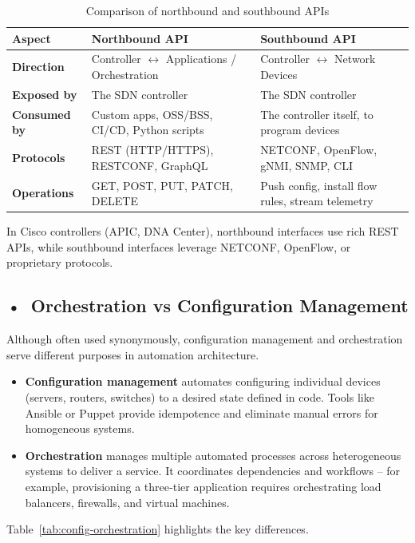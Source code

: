 \begin{table}[!htbp]
\centering
\small
\begin{tabularx}{\textwidth}{|p{2.5cm}|X|X|}
\hline
\textbf{Aspect} & \textbf{Northbound API} & \textbf{Southbound API} \\ \hline
\textbf{Direction} & Controller $\leftrightarrow$ Applications / Orchestration & Controller $\leftrightarrow$ Network Devices \\ \hline
\textbf{Exposed by} & The SDN controller & The SDN controller \\ \hline
\textbf{Consumed by} & Custom apps, OSS/BSS, CI/CD, Python scripts & The controller itself, to program devices \\ \hline
\textbf{Protocols} & REST (HTTP/HTTPS), RESTCONF, GraphQL & NETCONF, OpenFlow, gNMI, SNMP, CLI \\ \hline
\textbf{Operations} & GET, POST, PUT, PATCH, DELETE & Push config, install flow rules, stream telemetry \\ \hline
\end{tabularx}
\caption{Comparison of northbound and southbound APIs}
\label{tab:northbound-southbound}
\end{table}

In Cisco controllers (APIC, DNA Center), northbound interfaces use rich REST APIs, while southbound interfaces leverage NETCONF, OpenFlow, or proprietary protocols.

\subsection*{\mbox{•}~Orchestration vs Configuration Management}
Although often used synonymously, configuration management and orchestration serve different purposes in automation architecture.
\begin{itemize}
    \item \textbf{Configuration management} automates configuring individual devices (servers, routers, switches) to a desired state defined in code. Tools like Ansible or Puppet provide idempotence and eliminate manual errors for homogeneous systems.
    \item \textbf{Orchestration} manages multiple automated processes across heterogeneous systems to deliver a service. It coordinates dependencies and workflows – for example, provisioning a three‑tier application requires orchestrating load balancers, firewalls, and virtual machines.
\end{itemize}
Table~\ref{tab:config-orchestration} highlights the key differences.

